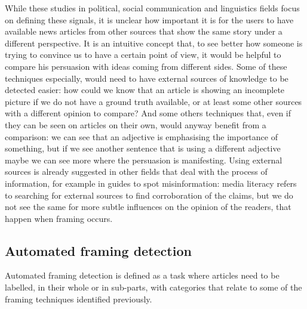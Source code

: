 While these studies in political, social communication and linguistics fields focus on defining these signals, it is unclear how important it is for the users to have available news articles from other sources that show the same story under a different perspective.
It is an intuitive concept that, to see better how someone is trying to convince us to have a certain point of view, it would be helpful to compare his persuasion with ideas coming from different sides.
Some of these techniques especially, would need to have external sources of knowledge to be detected easier: how could we know that an article is showing an incomplete picture if we do not have a ground truth available, or at least some other sources with a different opinion to compare?
And some others techniques that, even if they can be seen on articles on their own, would anyway benefit from a comparison: we can see that an adjective is emphasising the importance of something, but if we see another sentence that is using a different adjective maybe we can see more where the persuasion is manifesting.
Using external sources is already suggested in other fields that deal with the process of information, for example in guides to spot misinformation: media literacy refers to searching for external sources to find corroboration of the claims, but we do not see the same for more subtle influences on the opinion of the readers, that happen when framing occurs.


\subsection{Automated framing detection}
\label{ssec:lit_framing_auto}

Automated framing detection is defined as a task where articles need to be labelled, in their whole or in sub-parts, with categories that relate to some of the framing techniques identified previously.

